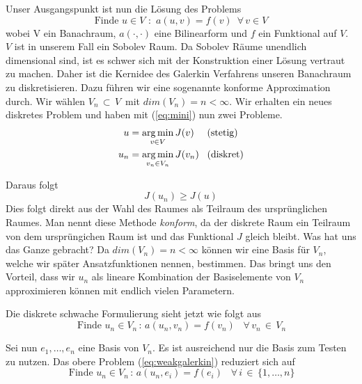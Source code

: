 Unser Ausgangspunkt ist nun die Lösung des Problems
\begin{equation} \label{eq:cont}
\text{Finde } u \in V \text{ : } \, a(u,v) = f(v) \, \, \, \forall \, v \in V
\end{equation}
wobei V ein Banachraum, $a(\cdot,\cdot)$ eine Bilinearform und $f$ ein Funktional auf $V$. $V$ ist in unserem Fall ein Sobolev Raum.
Da Sobolev Räume unendlich dimensional sind, ist es schwer sich mit der Konstruktion einer Lösung vertraut zu machen. Daher ist die Kernidee des Galerkin Verfahrens unseren Banachraum zu diskretisieren. 
Dazu führen wir eine sogenannte konforme Approximation durch.
Wir wählen $V_{n} \, \subset \,V \, $ mit $dim(V_{n}) = n < \infty $. Wir erhalten ein neues diskretes Problem und haben mit (\ref{eq:mini}) nun zwei Probleme.
\begin{equation*}
\begin{aligned}
u &= \operatorname*{arg\,min}_{v \in V} J(v)  \, \, \, \, \, \, \text{ (stetig)}\\
u_n &= \operatorname*{arg\,min}_{v_n \in V_n} J(v_n) \, \, \, \text{ (diskret)}
\end{aligned}
\end{equation*}

Daraus folgt
\begin{equation*}
J(u_n) \geq J(u)
\end{equation*}
Dies folgt direkt aus der Wahl des Raumes als Teilraum des ursprünglichen Raumes. Man nennt diese Methode \textit{konform}, da der diskrete Raum ein Teilraum von dem ursprüngichen Raum ist und das Funktional $J$ gleich bleibt. 
Was hat uns das Ganze gebracht? Da $dim(V_n) = n < \infty$ können wir eine Basis für $V_n$, welche wir später Ansatzfunktionen nennen, bestimmen. Das bringt uns den Vorteil, dass wir $u_n$ als lineare Kombination der Basiselemente von $V_n$ approximieren können mit endlich vielen Parametern. 

Die diskrete schwache Formulierung sieht jetzt wie folgt aus
\begin{equation}
\text{ Finde } u_n \in V_n  \, :  \, a(u_n,v_n)=f(v_n)  \, \, \,  \, \, \forall \, v_n \, \in \, V_n \, \label{eq:weakgalerkin} 
\end{equation}

Sei nun $e_1, \dots , e_n$ eine Basis von $V_n$. Es ist ausreichend nur die Basis zum Testen zu nutzen.
Das obere Problem (\ref{eq:weakgalerkin}) reduziert sich auf
\begin{equation} \label{eq:weak1}
\text{ Finde } u_n \in V_n  \, :  \, a(u_n,e_i)=f(e_i)  \, \, \,  \, \, \forall \, i \, \in \, \{1,\dots,n\} \,
\end{equation}

